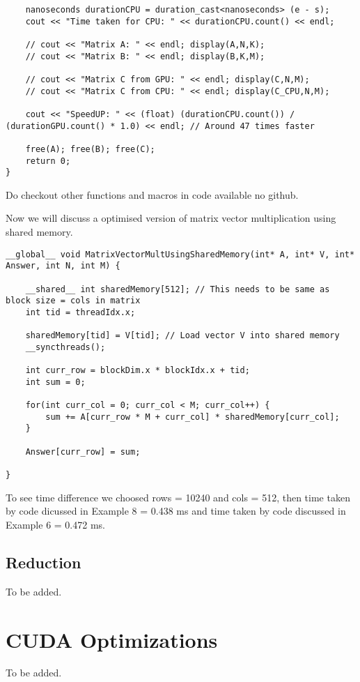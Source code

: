 \begin{lstlisting}
    nanoseconds durationCPU = duration_cast<nanoseconds> (e - s);
    cout << "Time taken for CPU: " << durationCPU.count() << endl;

    // cout << "Matrix A: " << endl; display(A,N,K);
    // cout << "Matrix B: " << endl; display(B,K,M);
    
    // cout << "Matrix C from GPU: " << endl; display(C,N,M);
    // cout << "Matrix C from CPU: " << endl; display(C_CPU,N,M);

    cout << "SpeedUP: " << (float) (durationCPU.count()) / (durationGPU.count() * 1.0) << endl; // Around 47 times faster

    free(A); free(B); free(C);
    return 0;
}
\end{lstlisting}
Do checkout other functions and macros in code available no github.

Now we will discuss a optimised version of matrix vector multiplication using shared memory.


\begin{lstlisting}
__global__ void MatrixVectorMultUsingSharedMemory(int* A, int* V, int* Answer, int N, int M) {
    
    __shared__ int sharedMemory[512]; // This needs to be same as block size = cols in matrix
    int tid = threadIdx.x;

    sharedMemory[tid] = V[tid]; // Load vector V into shared memory
    __syncthreads();

    int curr_row = blockDim.x * blockIdx.x + tid;
    int sum = 0;

    for(int curr_col = 0; curr_col < M; curr_col++) {
        sum += A[curr_row * M + curr_col] * sharedMemory[curr_col];
    }

    Answer[curr_row] = sum;

}
\end{lstlisting}

To see time difference we choosed rows = 10240 and cols = 512, then time taken by code dicussed in Example 8 = 0.438 ms and time taken by code discussed in Example 6 = 0.472 ms. 

\subsection*{Reduction}
To be added.

\section*{CUDA Optimizations}
To be added.